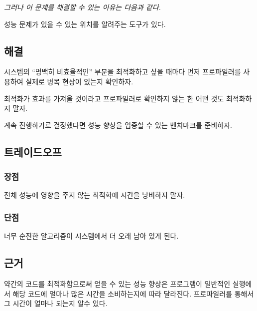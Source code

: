 \documentclass[a4paper,10pt,twoside]{book}
\begin{document}
\emph{그러나 이 문제를 해결할 수 있는 이유는 다음과 같다.}

\begin{bulletlist}
\item 성능 문제가 있을 수 있는 위치를 알려주는 도구가 있다.
\end{bulletlist}

\subsection*{해결}

시스템의 ``명백히 비효율적인'' 부분을 최적화하고 싶을 때마다 먼저 프로파일러를 사용하여 실제로 병목 현상이 있는지 확인하자. 

최적화가 효과를 가져올 것이라고 프로파일러로 확인하지 않는 한 어떤 것도 최적화하지 말자.

계속 진행하기로 결정했다면 성능 향상을 입증할 수 있는 벤치마크를 준비하자. 

\subsection*{트레이드오프}

\subsubsection*{장점}

\begin{bulletlist}
\item 전체 성능에 영향을 주지 않는 최적화에 시간을 낭비하지 말자.
\end{bulletlist}

\subsubsection*{단점}

\begin{bulletlist}
\item 너무 순진한 알고리즘이 시스템에서 더 오래 남아 있게 된다.
\end{bulletlist}

\subsection*{근거}

약간의 코드를 최적화함으로써 얻을 수 있는 성능 향상은 프로그램이 일반적인 실행에서 해당 코드에 얼마나 많은 시간을 소비하는지에 따라 달라진다. 프로파일러를 통해서 그 시간이 얼마나 되는지 알수 있다.
\end{document}
